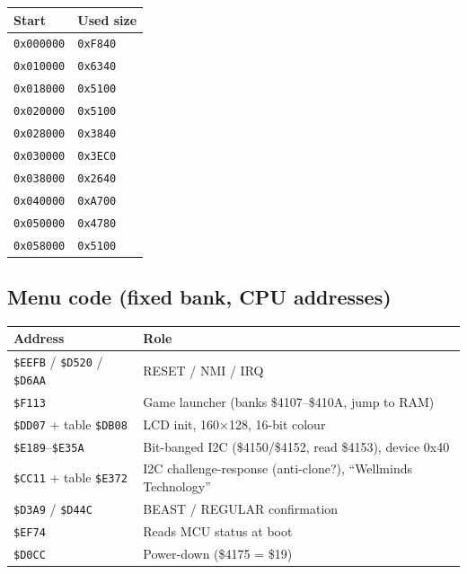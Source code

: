 \documentclass{article}
\begin{document}
\begin{center}
\begin{tabular}{ll}
\toprule
Start & Used size \\
\midrule
\texttt{0x000000} & \texttt{0xF840} \\
\texttt{0x010000} & \texttt{0x6340} \\
\texttt{0x018000} & \texttt{0x5100} \\
\texttt{0x020000} & \texttt{0x5100} \\
\texttt{0x028000} & \texttt{0x3840} \\
\texttt{0x030000} & \texttt{0x3EC0} \\
\texttt{0x038000} & \texttt{0x2640} \\
\texttt{0x040000} & \texttt{0xA700} \\
\texttt{0x050000} & \texttt{0x4780} \\
\texttt{0x058000} & \texttt{0x5100} \\
\bottomrule
\end{tabular}
\end{center}

\subsection*{Menu code (fixed bank, CPU addresses)}

\begin{center}
\begin{tabular}{ll}
\toprule
Address & Role \\
\midrule
\texttt{\$EEFB} / \texttt{\$D520} / \texttt{\$D6AA} & RESET / NMI / IRQ \\
\texttt{\$F113} & Game launcher (banks \$4107--\$410A, jump to RAM) \\
\texttt{\$DD07} + table \texttt{\$DB08} & LCD init, 160$\times$128, 16-bit colour \\
\texttt{\$E189}--\texttt{\$E35A} & Bit-banged I2C (\$4150/\$4152, read \$4153), device 0x40 \\
\texttt{\$CC11} + table \texttt{\$E372} & I2C challenge-response (anti-clone?), ``Wellminds Technology'' \\
\texttt{\$D3A9} / \texttt{\$D44C} & BEAST / REGULAR confirmation \\
\texttt{\$EF74} & Reads MCU status at boot \\
\texttt{\$D0CC} & Power-down (\$4175 = \$19) \\
\bottomrule
\end{tabular}
\end{center}
\end{document}

